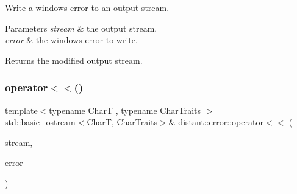 Write a windows error to an output stream. 


\begin{DoxyParams}{Parameters}
{\em stream} & the output stream. \\
\hline
{\em error} & the windows error to write. \\
\hline
\end{DoxyParams}
\begin{DoxyReturn}{Returns}
the modified output stream. 
\end{DoxyReturn}
\mbox{\label{namespacedistant_1_1error_acd5106fb576fa993cc526e3c9a14ef7b}} 
\subsubsection{\texorpdfstring{operator$<$$<$()}{operator<<()}\hspace{0.1cm}{\footnotesize\ttfamily [2/2]}}
{\footnotesize\ttfamily template$<$typename CharT , typename Char\+Traits $>$ \\
std\+::basic\+\_\+ostream$<$CharT, Char\+Traits$>$\& distant\+::error\+::operator$<$$<$ (\begin{DoxyParamCaption}\item[{std\+::basic\+\_\+ostream$<$ CharT, Char\+Traits $>$ \&}]{stream,  }\item[{const \mbox{\hyperlink{classdistant_1_1error_1_1windows__error}{windows\+\_\+error}} \&}]{error }\end{DoxyParamCaption})}

